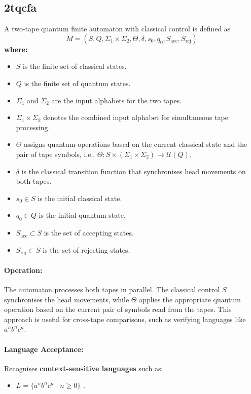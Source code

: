 \subsection{\acrfull{2tqcfa}}
\label{subsec:2tqcfa}
\begin{definition}
A two-tape quantum finite automaton with classical control is defined as 
\[
M = (S, Q, \Sigma_1 \times \Sigma_2, \Theta, \delta, s_0, q_0, S_{\text{acc}}, S_{\text{rej}})
\]
\textbf{where:}
\begin{itemize}
    \item \( S \) is the finite set of classical states.
    \item \( Q \) is the finite set of quantum states.
    \item \( \Sigma_1 \) and \( \Sigma_2 \) are the input alphabets for the two tapes.
    \item \( \Sigma_1 \times \Sigma_2 \) denotes the combined input alphabet for simultaneous tape processing.
    \item \( \Theta \) assigns quantum operations based on the current classical state and the pair of tape symbols, i.e., \(\Theta: S \times (\Sigma_1 \times \Sigma_2) \to \mathcal{U}(Q)\).
    \item \( \delta \) is the classical transition function that synchronises head movements on both tapes.
    \item \( s_0 \in S \) is the initial classical state.
    \item \( q_0 \in Q \) is the initial quantum state.
    \item \( S_{\text{acc}} \subset S \) is the set of accepting states.
    \item \( S_{\text{rej}} \subset S \) is the set of rejecting states.
\end{itemize}
\end{definition}

\paragraph{Operation:}  
The automaton processes both tapes in parallel. The classical control \( S \) synchronises the head movements, while \( \Theta \) applies the appropriate quantum operation based on the current pair of symbols read from the tapes. This approach is useful for cross-tape comparisons, such as verifying languages like \( a^n b^n c^n \).

\paragraph{Language Acceptance:}  
Recognises \textbf{context-sensitive languages} such as:
\begin{itemize}
    \item \( L = \{a^n b^n c^n \mid n \geq 0\} \) \cite{zheng2012two, gruska2005}.
\end{itemize}

